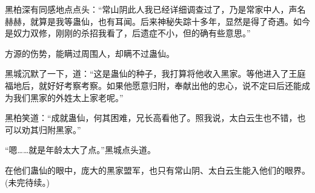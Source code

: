 \begin{this_body}
黑柏深有同感地点点头：“常山阴此人我已经详细调查过了，乃是常家中人，声名赫赫，就算是我等蛊仙，也有耳闻。后来神秘失踪十多年，显然是得了奇遇。如今是奴力双修，刚刚的杀招我看了，后遗症不小，但的确有些意思。”

方源的伤势，能瞒过周围人，却瞒不过蛊仙。

黑城沉默了一下，道：“这是蛊仙的种子，我打算将他收入黑家。等他进入了王庭福地后，就好好考察考察。如果他愿意归附，奉献出他的忠心，说不定曰后还能成为我们黑家的外姓太上家老呢。”

黑柏笑道：“成就蛊仙，何其困难，兄长高看他了。照我说，太白云生也不错，也可以劝其归附黑家。”

“嗯……就是年龄太大了点。”黑城点头道。

在他们蛊仙的眼中，庞大的黑家盟军，也只有常山阴、太白云生能入他们的眼界。(未完待续。)

\end{this_body}

